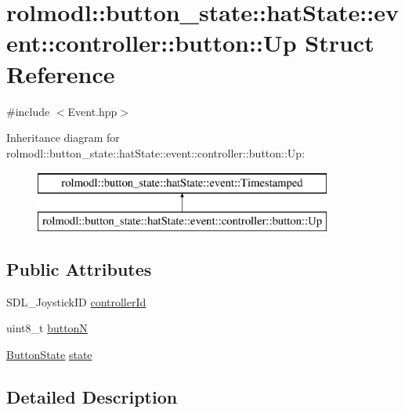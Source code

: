 \hypertarget{structrolmodl_1_1button__state_1_1hat_state_1_1event_1_1controller_1_1button_1_1_up}{}\section{rolmodl\+::button\+\_\+state\+::hat\+State\+::event\+::controller\+::button\+::Up Struct Reference}
\label{structrolmodl_1_1button__state_1_1hat_state_1_1event_1_1controller_1_1button_1_1_up}


{\ttfamily \#include $<$Event.\+hpp$>$}

Inheritance diagram for rolmodl\+::button\+\_\+state\+::hat\+State\+::event\+::controller\+::button\+::Up\+:\begin{figure}[H]
\begin{center}
\leavevmode
\includegraphics[height=2.000000cm]{structrolmodl_1_1button__state_1_1hat_state_1_1event_1_1controller_1_1button_1_1_up}
\end{center}
\end{figure}
\subsection*{Public Attributes}
\begin{DoxyCompactItemize}
\item 
S\+D\+L\+\_\+\+Joystick\+ID \mbox{\hyperlink{structrolmodl_1_1button__state_1_1hat_state_1_1event_1_1controller_1_1button_1_1_up_af77630b7440e518b14bbb9b9cc0fcdb5}{controller\+Id}}
\item 
uint8\+\_\+t \mbox{\hyperlink{structrolmodl_1_1button__state_1_1hat_state_1_1event_1_1controller_1_1button_1_1_up_a68e0c0865758bcdd9a4229a48654cc20}{buttonN}}
\item 
\mbox{\hyperlink{namespacerolmodl_ad08ec5c56aa1db118f871357b2d475fd}{Button\+State}} \mbox{\hyperlink{structrolmodl_1_1button__state_1_1hat_state_1_1event_1_1controller_1_1button_1_1_up_a89486a7d9abdd86690a2616ab523f894}{state}}
\end{DoxyCompactItemize}


\subsection{Detailed Description}


